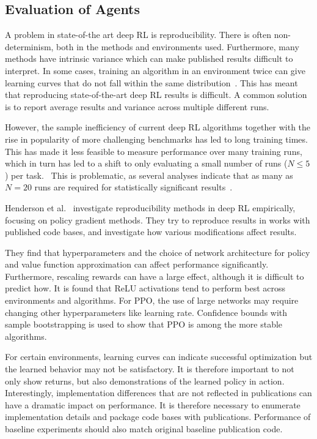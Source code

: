 \subsection{Evaluation of Agents}
\label{sec:theory-evaluation}

A problem in state-of-the art deep RL is reproducibility.
There is often non-determinism, both in the methods and environments used.
Furthermore, many methods have intrinsic variance which can make published results difficult to interpret.
In some cases, training an algorithm in an environment twice can give learning curves that do not fall within the same distribution~\cite{henderson_deep_2018}.
This has meant that reproducing state-of-the-art deep RL results is difficult.
A common solution is to report average results and variance across multiple different runs.

However, the sample inefficiency of current deep RL algorithms together with the rise in popularity of more challenging benchmarks has led to long training times.
This has made it less feasible to measure performance over many training runs,
which in turn has led to a shift to only evaluating a small number of runs (\(N \leq 5\)) per task.~\cite{agarwal_deep_2022}
This is problematic, as several analyses indicate that as many as \(N = 20\) runs are required for statistically significant results~\cite{colas_how_2018,colas_hitchhikers_2019}.

Henderson et al.~\cite{henderson_deep_2018} investigate reproducibility methods in deep RL empirically, focusing on policy gradient methods.
They try to reproduce results in works with published code bases, and investigate how various modifications affect results.

They find that hyperparameters and the choice of network architecture for policy and value function approximation can affect performance significantly.
Furthermore, rescaling rewards can have a large effect, although it is difficult to predict how.
It is found that ReLU activations tend to perform best across environments and algorithms.
For PPO, the use of large networks may require changing other hyperparameters like learning rate.
Confidence bounds with sample bootstrapping is used to show that PPO is among the more stable algorithms.

For certain environments, learning curves can indicate successful optimization but the learned behavior may not be satisfactory.
It is therefore important to not only show returns, but also demonstrations of the learned policy in action.
Interestingly, implementation differences that are not reflected in publications can have a dramatic impact on performance.
It is therefore necessary to enumerate implementation details and package code bases with publications.
Performance of baseline experiments should also match original baseline publication code.

